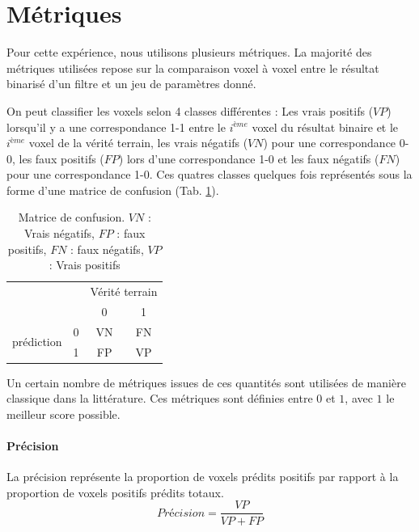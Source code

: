 \section{Métriques}

Pour cette expérience, nous utilisons plusieurs métriques. La majorité des métriques utilisées repose sur la comparaison voxel à voxel entre le résultat binarisé d'un filtre et un jeu de paramètres donné.

On peut classifier les voxels selon 4 classes différentes : Les vrais positifs ($VP$) lorsqu'il y a une correspondance 1-1 entre le $i^{ème}$ voxel du résultat binaire et le $i^{ème}$ voxel de la vérité terrain, les vrais négatifs ($VN$) pour une correspondance 0-0, les faux positifs ($FP$) lors d'une correspondance 1-0 et les faux négatifs ($FN$) pour une correspondance 1-0. Ces quatres classes quelques fois représentés sous la forme d'une matrice de confusion (Tab. \ref{tab:confusion_matrix}).

\begin{table}
  \centering
  \begin{tabular}{ cccc }
    \hline
                                      &   &\multicolumn{2}{c}{Vérité terrain} \\
                                      &   & 0  & 1 \\
      \multirow{2}{*}{prédiction}     & 0 & VN & FN \\
                                      & 1 & FP & VP  \\
    \hline
  \end{tabular}
  \caption{Matrice de confusion. $VN$ : Vrais négatifs, $FP$ : faux positifs, $FN$ : faux négatifs, $VP$ : Vrais positifs}
  \label{tab:confusion_matrix}
\end{table}

Un certain nombre de métriques issues de ces quantités sont utilisées de manière classique dans la littérature. Ces métriques sont définies entre $0$ et $1$, avec $1$ le meilleur score possible. 

\paragraph{Précision}
La précision représente la proportion de voxels prédits positifs par rapport à la proportion de voxels positifs prédits totaux.
\begin{equation}
  Précision = \frac{VP}{VP+FP}
\end{equation}

